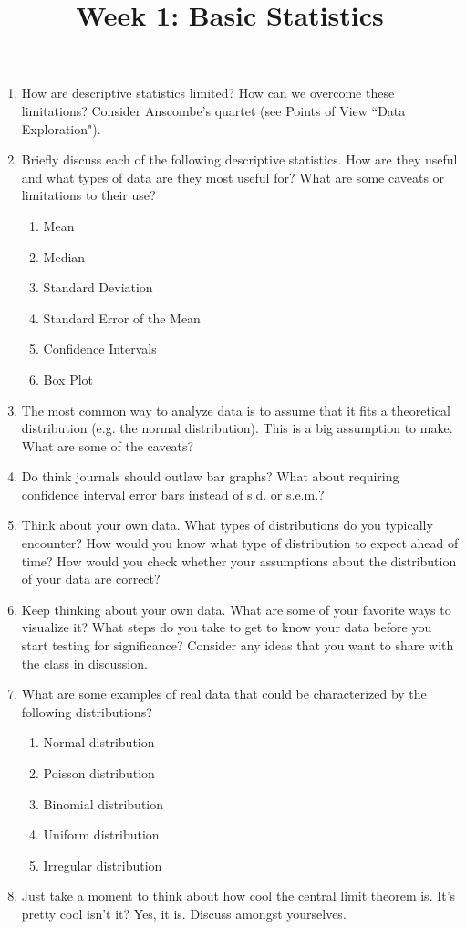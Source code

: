 \documentclass{article}
\title{Week 1: Basic Statistics}
\begin{document}
\maketitle

\begin{enumerate}
\item How are descriptive statistics limited?  How can we overcome these limitations?  Consider Anscombe's quartet (see Points of View ``Data Exploration").

\item Briefly discuss each of the following descriptive statistics. How are they useful and what types of data are they most useful for? What are some caveats or limitations to their use?

\begin{enumerate}
	\item  Mean
	\item Median
	\item Standard Deviation
	\item Standard Error of the Mean
	\item Confidence Intervals
	\item Box Plot
\end{enumerate}

\item The most common way to analyze data is to assume that it fits a theoretical distribution (e.g. the normal distribution). This is a big assumption to make. What are some of the caveats?

\item Do think journals should outlaw bar graphs? What about requiring confidence interval error bars instead of s.d. or s.e.m.?

\item Think about your own data. What types of distributions do you typically encounter? How would you know what type of distribution to expect ahead of time? How would you check whether your assumptions about the distribution of your data are correct?

\item Keep thinking about your own data. What are some of your favorite ways to visualize it? What steps do you take to get to know your data before you start testing for significance? Consider any ideas that you want to share with the class in discussion.

\item What are some examples of real data that could be characterized by the following distributions?
\begin{enumerate}
	\item Normal distribution
	\item Poisson distribution
	\item Binomial distribution
	\item Uniform distribution
	\item Irregular distribution
\end{enumerate}

\item Just take a moment to think about how cool the central limit theorem is. It's pretty cool isn't it? Yes, it is. Discuss amongst yourselves.
\end{enumerate}
\end{document}
